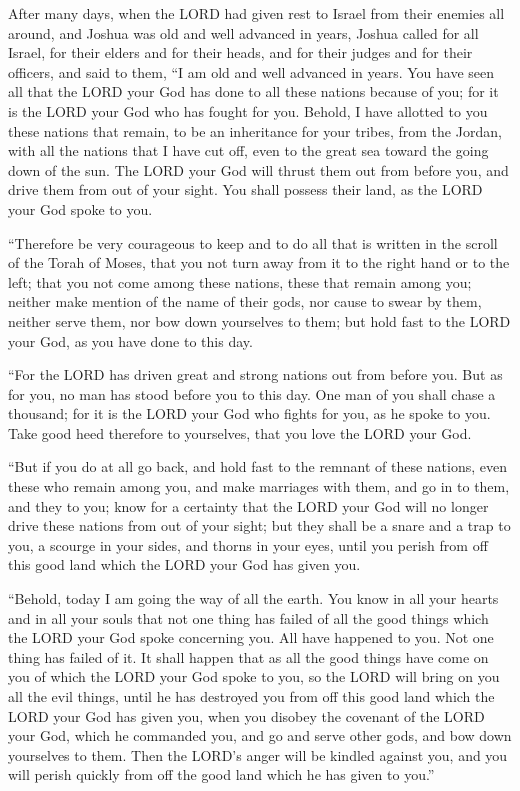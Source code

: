 \mychapter{} \myverse*{}After many days, when the LORD had given rest to Israel from their
enemies all around, and Joshua was old and well advanced in years,
\myverse{}Joshua called for all Israel, for their elders and for their heads, and for
their judges and for their officers, and said to them, “I am old and well advanced in years.
\myverse{}You have seen all that the LORD your God has done to all these nations because
of you; for it is the LORD your God who has fought for you.
\myverse{}Behold, I have allotted to you these nations that remain, to be an inheritance
for your tribes, from the Jordan, with all the nations that I have cut off, even to the great sea toward
the going down of the sun.
\myverse{}The LORD your God will thrust them out from before you, and drive them from
out of your sight. You shall possess their land, as the LORD your God spoke to you.

\myverse{}“Therefore be very courageous to keep and to do all that is written
in the scroll of the Torah of Moses, that you not turn away from it to the right hand or to the left;
\myverse{}that you not come among these nations, these that remain among you; neither
make mention of the name of their gods, nor cause to swear by them, neither serve them, nor bow down yourselves
to them;
\myverse{}but hold fast to the LORD your God, as you have done to this day.

\myverse{}“For the LORD has driven great and strong nations out from before
you. But as for you, no man has stood before you to this day.
\myverse{}One man of you shall chase a thousand; for it is the LORD your God who fights
for you, as he spoke to you.
\myverse{}Take good heed therefore to yourselves, that you love the LORD your God.

\myverse{}“But if you do at all go back, and hold fast to the remnant
of these nations, even these who remain among you, and make marriages with them, and go in to them, and
they to you;
\myverse{}know for a certainty that the LORD your God will no longer drive these nations
from out of your sight; but they shall be a snare and a trap to you, a scourge in your sides, and thorns
in your eyes, until you perish from off this good land which the LORD your God has given you.

\myverse{}“Behold, today I am going the way of all the earth. You know
in all your hearts and in all your souls that not one thing has failed of all the good things which the
LORD your God spoke concerning you. All have happened to you. Not one thing has failed of it.
\myverse{}It shall happen that as all the good things have come on you of which the
LORD your God spoke to you, so the LORD will bring on you all the evil things, until he has destroyed
you from off this good land which the LORD your God has given you,
\myverse{}when you disobey the covenant of the LORD your God, which he commanded you,
and go and serve other gods, and bow down yourselves to them. Then the LORD’s anger will be kindled against
you, and you will perish quickly from off the good land which he has given to you.”


